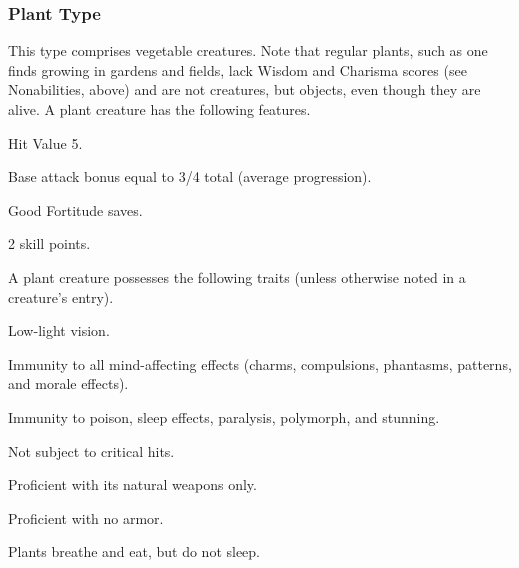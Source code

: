 \subsubsection{Plant Type} This type comprises vegetable creatures. Note that regular plants, such as one finds growing in gardens and fields, lack Wisdom and Charisma scores (see Nonabilities, above) and are not creatures, but objects, even though they are alive. 
 A plant creature has the following features. 
\begin{itemize*}
\item Hit Value 5.
\item Base attack bonus equal to 3/4 total  (average progression).
\item Good Fortitude saves.
\item 2 skill points.
\end{itemize*}
 A plant creature possesses the following traits (unless otherwise noted in a creature's entry).
\begin{itemize*}
\item Low-light vision.
\item Immunity to all mind-affecting effects (charms, compulsions, phantasms, patterns, and morale effects).
\item Immunity to poison, sleep effects, paralysis, polymorph, and stunning.
\item Not subject to critical hits.
\item Proficient with its natural weapons only.
\item Proficient with no armor.
\item Plants breathe and eat, but do not sleep.
\end{itemize*}

